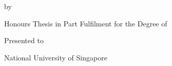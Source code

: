 \thispagestyle{empty}
\begin{center}
\large\bfseries{}
\vspace*{-0.08cm}
\thesistitle

\vspace{156.5pt}
by

\thesisauthor
\vspace{156.5pt}

Honours Thesis in Part Fulfilment for the Degree of

\thesisdegree

\vspace{28.4pt}
Presented to

\thesisdept

National University of Singapore \thesisyear
\end{center}
\clearpage
